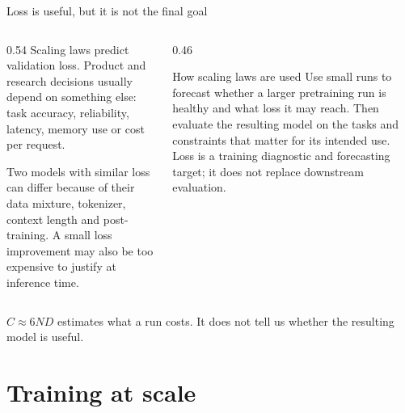 \documentclass[aspectratio=169,10pt]{beamer}
\begin{document}
\begin{frame}{Loss is useful, but it is not the final goal}
  \begin{columns}[T]
    \begin{column}{0.54\textwidth}
      Scaling laws predict validation loss. Product and research decisions
      usually depend on something else: task accuracy, reliability, latency,
      memory use or cost per request.
      \vspace{0.5em}

      Two models with similar loss can differ because of their data mixture,
      tokenizer, context length and post-training. A small loss improvement may
      also be too expensive to justify at inference time.
    \end{column}
    \begin{column}{0.46\textwidth}
      \begin{block}{How scaling laws are used}
        \small
        Use small runs to forecast whether a larger pretraining run is healthy
        and what loss it may reach.
        \vspace{0.4em}
        Then evaluate the resulting model on the tasks and constraints that
        matter for its intended use.
        \vspace{0.4em}
        Loss is a training diagnostic and forecasting target; it does not
        replace downstream evaluation.
      \end{block}
    \end{column}
  \end{columns}
  \vfill
  \begin{takeaway}
    $C \approx 6ND$ estimates what a run costs. It does not tell us whether the
    resulting model is useful.
  \end{takeaway}
\end{frame}

\section{Training at scale}
\end{document}
